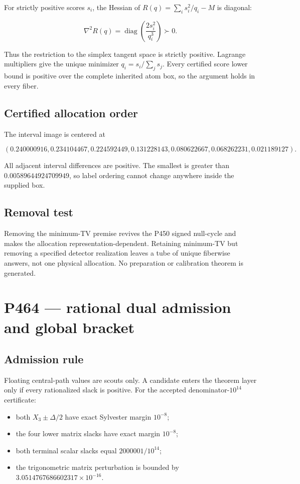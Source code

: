\documentclass[11pt,a4paper,openany]{report}
\begin{document}
For strictly positive scores \(s_i\), the Hessian of \(R(q)=\sum_i s_i^2/q_i-M\) is diagonal:

\[
\nabla^2R(q)=\operatorname{diag}\left(\frac{2s_i^2}{q_i^3}\right)\succ0.
\]

Thus the restriction to the simplex tangent space is strictly positive. Lagrange multipliers give the unique minimizer \(q_i=s_i/\sum_j s_j\). Every certified score lower bound is positive over the complete inherited atom box, so the argument holds in every fiber.

\section{Certified allocation order}

The interval image is centered at

\[
(0.240000916,0.234104467,0.224592449,0.131228143,
0.080622667,0.068262231,0.021189127).
\]

All adjacent interval differences are positive. The smallest is greater than \(0.00589644924709949\), so label ordering cannot change anywhere inside the supplied box.

\section{Removal test}

Removing the minimum-TV premise revives the P450 signed null-cycle and makes the allocation representation-dependent. Retaining minimum-TV but removing a specified detector realization leaves a tube of unique fiberwise answers, not one physical allocation. No preparation or calibration theorem is generated.

\chapter{P464 --- rational dual admission and global bracket}

\section{Admission rule}

Floating central-path values are scouts only. A candidate enters the theorem layer only if every rationalized slack is positive. For the accepted denominator-\(10^{14}\) certificate:

\begin{itemize}
\item 
both \(X_3\pm\Delta/2\) have exact Sylvester margin \(10^{-8}\);

\item 
the four lower matrix slacks have exact margin \(10^{-8}\);

\item 
both terminal scalar slacks equal \(2000001/10^{14}\);

\item 
the trigonometric matrix perturbation is bounded by \(3.0514767686602317\times10^{-16}\).

\end{itemize}
\end{document}
